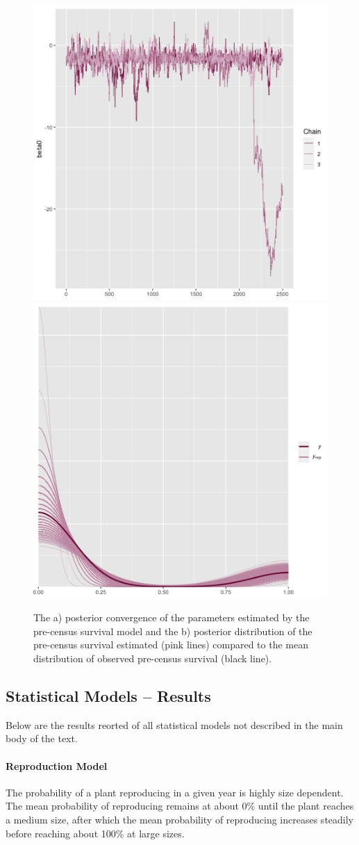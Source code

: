 \documentclass[11pt]{article}
\begin{document}
 \begin{figure}
 	\includegraphics[width = 0.45\linewidth]{Figures/seed_surv_conv.png}
 	\includegraphics[width=0.45\linewidth]{Figures/seed_surv_post.png}
 	\caption{The a) posterior convergence of the parameters estimated by the pre-census survival model and the b) posterior distribution of the pre-census survival estimated (pink lines) compared to the mean distribution of observed pre-census survival (black line).}
 	\label{fig:Pre_Surv_post}
 \end{figure}
 
 \subsection*{Statistical Models -- Results}
 Below are the results reorted of all statistical models not described in the main body of the text. 
 
 \paragraph{Reproduction Model}
 The probability of a plant reproducing in a given year is highly size dependent. 
 The mean probability of reproducing remains at about 0\% until the plant reaches a medium size, after which the mean probability of reproducing increases steadily before reaching about 100\% at large sizes. 
 
\end{document}
